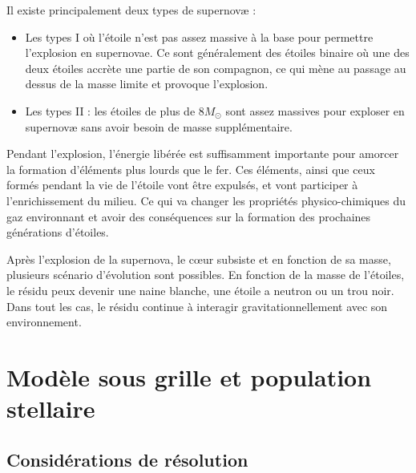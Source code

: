 Il existe principalement deux types de supernovæ : 
\begin{itemize}
\item Les types I où l'étoile n'est pas assez massive à la base pour permettre l'explosion en supernovae.
Ce sont généralement des étoiles binaire où une des deux étoiles accrète une partie de son compagnon, ce qui mène au passage au dessus de la masse limite et provoque l'explosion.
\item Les types II : les étoiles de plus de 8$M_\odot$ sont assez massives pour exploser en supernovæ sans avoir besoin de masse supplémentaire.
\end{itemize}

Pendant l'explosion, l'énergie libérée est suffisamment importante pour amorcer la formation d'éléments plus lourds que le fer.
Ces éléments, ainsi que ceux formés pendant la vie de l'étoile vont être expulsés, et vont participer à l'enrichissement du milieu.
Ce qui va changer les propriétés physico-chimiques du gaz environnant et avoir des conséquences sur la formation des prochaines générations d'étoiles.

Après l'explosion de la supernova, le cœur subsiste et en fonction de sa masse, plusieurs scénario d'évolution sont possibles.
En fonction de la masse de l'étoiles, le résidu peux devenir une naine blanche, une étoile a neutron ou un trou noir.
Dans tout les cas, le résidu continue à interagir gravitationnellement avec son environnement.


\clearpage
\section{Modèle sous grille et population stellaire}

\subsection{Considérations de résolution}

